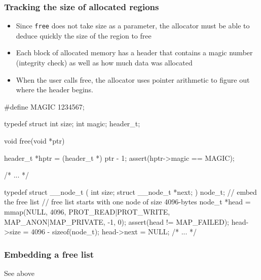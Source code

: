 \documentclass[11pt, a4paper]{article}
\theoremstyle{definition}
\theoremstyle{remark}
\begin{document}
\subsubsection{Tracking the size of allocated regions}
\begin{itemize}
  \item Since \texttt{free} does not take size as a parameter, the allocator must be able to deduce quickly the size of the region to free
  \item Each block of allocated memory has a header that contains a magic number (integrity check) as well as how much data was allocated
\end{itemize}
\begin{center}
\end{center}
\begin{itemize}
  \item When the user calls free, the allocator uses pointer arithmetic to figure out where the header begins.
\end{itemize}
\newpage
\begin{ccode}
#define MAGIC 1234567;

typedef struct {
  int size;
  int magic;
} header_t;

void free(void *ptr) {
  header_t *hptr = (header_t *) ptr - 1;
  assert(hptr->magic == MAGIC);

  /* ... */
}

typedef struct __node_t (
  int size;
  struct __node_t *next;
) node_t;
// embed the free list 
// free list starts with one node of size 4096-bytes
node_t *head = mmap(NULL, 4096, PROT_READ|PROT_WRITE, MAP_ANON|MAP_PRIVATE, -1, 0);
assert(head != MAP_FAILED);
head->size = 4096 - sizeof(node_t);
head->next = NULL;
/* ... */
\end{ccode}
\subsubsection{Embedding a free list}
See above  \\
\end{document}

